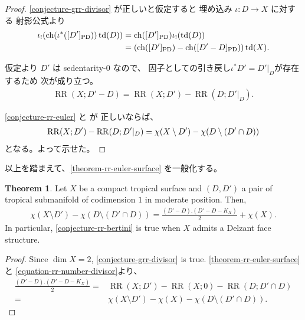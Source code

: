 \documentclass[a4paper,dvipdfmx,reqno,12pt]{amsart}
\theoremstyle{definition}
\newtheorem{theorem}{Theorem}[section]
\newcommand{\opn}[1]{\operatorname{#1}}
\newcommand{\PD}[1]{[#1]_{\mathrm{PD}}}
\numberwithin{equation}{section}
\begin{document}
\begin{proof}
\cref{conjecture-grr-divisor} が正しいと仮定すると
埋め込み $\iota\colon D\to X$ に対する
射影公式より
\begin{align}
\iota_!(\opn{ch}(\iota^{*}(\PD{D'}))\opn{td}(D))
&=\opn{ch}(\PD{D'})\iota_!(\opn{td}(D)) \notag \\
&=(\opn{ch}(\PD{D'})-\opn{ch}(\PD{D'-D}))\opn{td}(X).
\end{align}

仮定より $D'$ は sedentarity-$0$ なので、
因子としての引き戻し$\iota^{*}D'=D'|_{D}$が存在するため
次が成り立つ。
\begin{align}
\label{equation-rr-number-divisor}
\opn{RR}(X;D'-D)=\opn{RR}(X;D')-
\opn{RR}(D;D'|_{D}).
\end{align}

\cref{conjecture-rr-euler} と
\cite[Conjecture 6.13]{demedrano2023chern} が
正しいならば、
\begin{align}
\opn{RR}(X;D')-
\opn{RR}(D;D'|_{D})=
\chi(X\setminus D')-\chi(D\setminus (D'\cap D)) \notag
\end{align}
となる。よって示せた。
\end{proof}

以上を踏まえて、\cref{theorem-rr-euler-surface}
を一般化する。

\begin{theorem}
\label{theorem-rr-bertini-surface}
Let $X$ be a compact tropical surface
and $(D,D')$ a pair of tropical submanifold of
codimension $1$ in moderate position. Then,
\begin{align}
\chi(X\setminus D')-\chi(D\setminus (D'\cap D))
=\frac{(D'-D).(D'-D-K_X)}{2}+\chi(X).
\end{align}
In particular, \cref{conjecture-rr-bertini} is true 
when $X$ admits a Delzant face structure.
\end{theorem}

\begin{proof}
Since $\dim X=2$, 
\cref{conjecture-grr-divisor} is true.
\cref{theorem-rr-euler-surface}と
\eqref{equation-rr-number-divisor}より、
\begin{align}
\frac{(D'-D).(D'-D-K_X)}{2}=&
\opn{RR}(X;D')-\opn{RR}(X;0)-
\opn{RR}(D;D'\cap D) \\
=&\chi(X\setminus D')-\chi(X)-\chi(D\setminus (D'\cap D)).
\end{align}
\end{proof}
\end{document}

